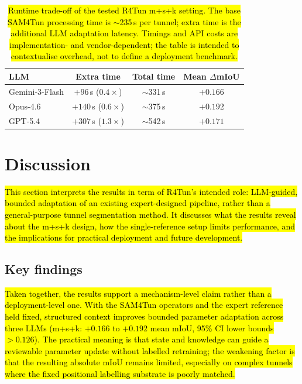 \documentclass[a4paper,fleqn]{cas-dc}
\begin{document}
\begin{table}[ht]
\caption{\hl{Runtime trade-off of the tested R4Tun m+s+k setting. The base SAM4Tun processing time is $\sim$235\,s per tunnel; extra time is the additional LLM adaptation latency. Timings and API costs are implementation- and vendor-dependent; the table is intended to contextualise overhead, not to define a deployment benchmark.}}\label{tab:runtime-tradeoff}
\begin{tabular*}{\tblwidth}{@{} l c c c @{}}
\toprule
LLM & Extra time & Total time & Mean $\Delta$mIoU \\
\midrule
Gemini-3-Flash & $+96$\,s ($0.4\times$) & $\sim$331\,s & $+0.166$ \\
Opus-4.6 & $+140$\,s ($0.6\times$) & $\sim$375\,s & $+0.192$ \\
GPT-5.4 & $+307$\,s ($1.3\times$) & $\sim$542\,s & $+0.171$ \\
\bottomrule
\end{tabular*}
\end{table}



\section{Discussion}\label{sec:discussion}

\hl{This section interprets the results in term of R4Tun's intended role: LLM-guided, bounded adaptation of an existing expert-designed pipeline, rather than a general-purpose tunnel segmentation method. It discusses what the results reveal about the m+s+k design, how the single-reference setup limits performance, and the implications for practical deployment and future development.}

\subsection{Key findings}

\hl{Taken together, the results support a mechanism-level claim rather than a deployment-level one. With the SAM4Tun operators and the expert reference held fixed, structured context improves bounded parameter adaptation across three LLMs (m+s+k: $+0.166$ to $+0.192$ mean mIoU, 95\% CI lower bounds $>0.126$). The practical meaning is that state and knowledge can guide a reviewable parameter update without labelled retraining; the weakening factor is that the resulting absolute mIoU remains limited, especially on complex tunnels where the fixed positional labelling substrate is poorly matched.}
\end{document}
